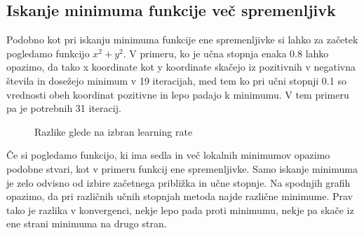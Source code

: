 \documentclass{article}
\begin{document}
\newpage
\subsection{Iskanje minimuma funkcije več spremenljivk}
Podobno kot pri iskanju minimuma funkcije ene spremenljivke si lahko za začetek pogledamo funkcijo $x^2+y^2$. V primeru, ko je učna stopnja enaka 0.8 lahko opazimo, da tako x koordinate kot y koordinate skačejo iz pozitivnih v negativna števila in dosežejo minimum v 19 iteracijah, med tem ko pri učni stopnji 0.1 so vrednosti obeh koordinat pozitivne in lepo padajo k minimumu. V tem primeru pa je potrebnih 31 iteracij.\\

\begin{figure}[h]
    \centering
    \caption{Razlike glede na izbran learning rate}
    \label{fig:foobar}
\end{figure}


\noindent Če si pogledamo funkcijo, ki ima sedla in več lokalnih minimumov opazimo podobne stvari, kot v primeru funkcij ene spremenljivke. Samo iskanje minimuma je zelo odvisno od izbire začetnega približka in učne stopnje. Na spodnjih grafih opazimo, da pri različnih učnih stopnjah metoda najde različne minimume. Prav tako je razlika v konvergenci, nekje lepo pada proti minimumu, nekje pa skače iz ene strani minimuma na drugo stran.
\end{document}
